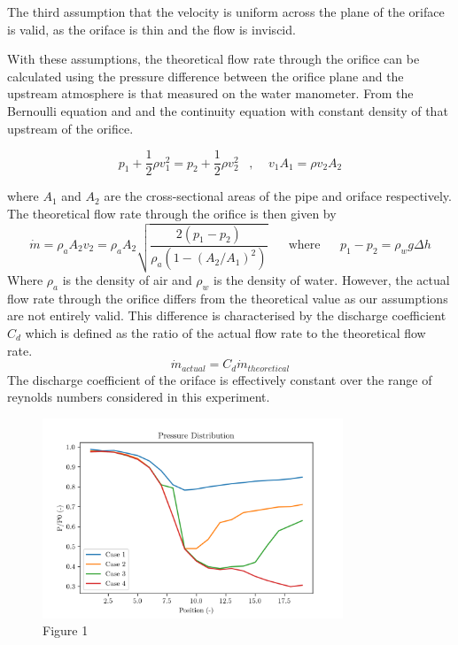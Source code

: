\documentclass[8pt]{article}
\begin{document}
The third assumption that the velocity is uniform across the plane of the oriface is valid, as the oriface is thin and the flow is inviscid.

With these assumptions, the theoretical flow rate through the orifice can be calculated using the pressure difference between the orifice plane and the upstream atmosphere is that measured on the
water manometer. From the Bernoulli equation and and the continuity equation with constant density of that upstream of the orifice.

\begin{equation}
    p_1 + \frac{1}{2} \rho v_1^2 = p_2 + \frac{1}{2} \rho v_2^2 \;\;\;,\;\;\;\; v_1 A_1 = \rho v_2 A_2
\end{equation}

where $A_1$ and $A_2$ are the cross-sectional areas of the pipe and oriface respectively. The theoretical flow rate through the orifice is then given by
\begin{equation}
    \dot{m} = \rho_a A_2 v_2 = \rho_a A_2 \sqrt{\frac{2(p_1-p_2)}{\rho_a(1-(A_2/A_1)^2)}} \;\;\;\;\;\; \text{where} \;\;\;\;\;\ p_1 - p_2 = \rho_w g \Delta h
\end{equation}
Where $\rho_a$ is the density of air and $\rho_w$ is the density of water.
However, the actual flow rate through the orifice differs from the theoretical value as our assumptions are not entirely valid.
This difference is characterised by the discharge coefficient $C_d$ which is defined as the ratio of the actual flow rate to the theoretical flow rate.
\begin{equation}
    \dot{m}_{actual} = C_d \dot{m}_{theoretical}
\end{equation}
The discharge coefficient of the oriface is effectively constant over the range of reynolds numbers considered in this experiment. 

\begin{figure}[H]
    \centering
    \includegraphics[width=0.8\textwidth]{pressure_ratio_distribution_corrected.png}
    \caption{Figure 1}
    \label{fig:figure4}
\end{figure}
\end{document}
